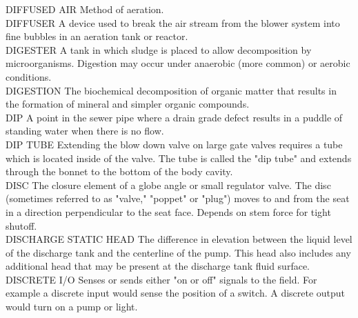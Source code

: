 DIFFUSED AIR
Method of aeration.
\vspace{0.3cm}\\
DIFFUSER
A device used to break the air stream from the blower system into fine bubbles in an aeration tank or reactor.
\vspace{0.3cm}\\
DIGESTER
A tank in which sludge is placed to allow decomposition by microorganisms. Digestion may occur under anaerobic (more common) or aerobic conditions.
\vspace{0.3cm}\\
DIGESTION
The biochemical decomposition of organic matter that results in the formation of mineral and simpler organic compounds.
\vspace{0.3cm}\\
DIP
A point in the sewer pipe where a drain grade defect results in a puddle of standing water when there is no flow. 
\vspace{0.3cm}\\
DIP TUBE
Extending the blow down valve on large gate valves requires a tube which is located inside of the valve. The tube is called the "dip tube" and extends through the bonnet to the bottom of the body cavity.
\vspace{0.3cm}\\
DISC
The closure element of a globe angle or small regulator valve. The disc (sometimes referred to as "valve," "poppet" or "plug") moves to and from the seat in a direction perpendicular to the seat face. Depends on stem force for tight shutoff.
\vspace{0.3cm}\\
DISCHARGE STATIC HEAD
The difference in elevation between the liquid level of the discharge tank and the centerline of the pump. This head also includes any additional head that may be present at the discharge tank fluid surface.
\vspace{0.3cm}\\

DISCRETE I/O
Senses or sends either "on or off" signals to the field. For example a discrete input would sense the position of a switch. A discrete output would turn on a pump or light.
\vspace{0.3cm}\\

